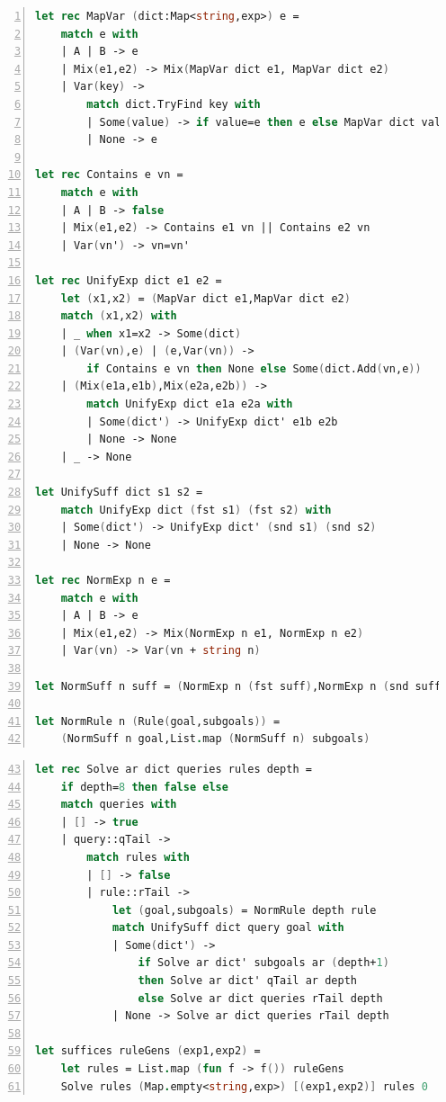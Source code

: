 \documentclass[11pt,a4paper]{article}
\begin{document}
\begin{lstlisting}[language=FSharp,numbers=left,xleftmargin=3em]
let rec MapVar (dict:Map<string,exp>) e =
    match e with
    | A | B -> e
    | Mix(e1,e2) -> Mix(MapVar dict e1, MapVar dict e2)
    | Var(key) ->
        match dict.TryFind key with
        | Some(value) -> if value=e then e else MapVar dict value
        | None -> e

let rec Contains e vn =
    match e with
    | A | B -> false
    | Mix(e1,e2) -> Contains e1 vn || Contains e2 vn
    | Var(vn') -> vn=vn'

let rec UnifyExp dict e1 e2 =
    let (x1,x2) = (MapVar dict e1,MapVar dict e2)
    match (x1,x2) with
    | _ when x1=x2 -> Some(dict)
    | (Var(vn),e) | (e,Var(vn)) ->
        if Contains e vn then None else Some(dict.Add(vn,e))
    | (Mix(e1a,e1b),Mix(e2a,e2b)) ->
        match UnifyExp dict e1a e2a with
        | Some(dict') -> UnifyExp dict' e1b e2b
        | None -> None
    | _ -> None

let UnifySuff dict s1 s2 =
    match UnifyExp dict (fst s1) (fst s2) with
    | Some(dict') -> UnifyExp dict' (snd s1) (snd s2)
    | None -> None

let rec NormExp n e =
    match e with
    | A | B -> e
    | Mix(e1,e2) -> Mix(NormExp n e1, NormExp n e2)
    | Var(vn) -> Var(vn + string n)

let NormSuff n suff = (NormExp n (fst suff),NormExp n (snd suff))

let NormRule n (Rule(goal,subgoals)) =
    (NormSuff n goal,List.map (NormSuff n) subgoals)
\end{lstlisting}

\newpage

\begin{lstlisting}[language=FSharp,numbers=left,firstnumber=43,xleftmargin=3em]
let rec Solve ar dict queries rules depth =
    if depth=8 then false else
    match queries with
    | [] -> true
    | query::qTail ->
        match rules with
        | [] -> false
        | rule::rTail ->
            let (goal,subgoals) = NormRule depth rule
            match UnifySuff dict query goal with
            | Some(dict') ->
                if Solve ar dict' subgoals ar (depth+1)
                then Solve ar dict' qTail ar depth
                else Solve ar dict queries rTail depth
            | None -> Solve ar dict queries rTail depth

let suffices ruleGens (exp1,exp2) =
    let rules = List.map (fun f -> f()) ruleGens
    Solve rules (Map.empty<string,exp>) [(exp1,exp2)] rules 0
\end{lstlisting}
\end{document}
